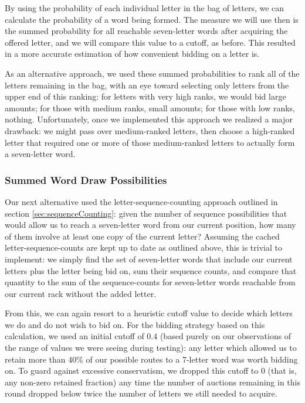 \documentclass[11pt]{article}
\begin{document}
By using the probability of each individual letter in the bag of letters, we can calculate the probability of a word being formed. 
The measure we will use then is the summed probability for all reachable seven-letter words after acquiring the offered letter, and we will compare this value to a cutoff, as before. This resulted in a more accurate estimation of how convenient bidding on a letter is.

As an alternative approach, we used these summed probabilities to rank all of the letters remaining in the bag, with an eye toward selecting only letters from the upper end of this ranking: for letters with very high ranks, we would bid large amounts; for those with medium ranks, small amounts; for those with low ranks, nothing.  Unfortunately, once we implemented this approach we realized a major drawback: we might pass over medium-ranked letters, then choose a high-ranked letter that required one or more of those medium-ranked letters to actually form a seven-letter word.

\subsubsection{Summed Word Draw Possibilities}

Our next alternative used the letter-sequence-counting approach outlined in section \ref{sec:sequenceCounting}: given the number of sequence possibilities that would allow us to reach a seven-letter word from our current position, how many of them involve at least one copy of the current letter?  Assuming the cached letter-sequence-counts are kept up to date as outlined above, this is trivial to implement: we simply find the set of seven-letter words that include our current letters plus the letter being bid on, sum their sequence counts, and compare that quantity to the sum of the sequence-counts for seven-letter words reachable from our current rack without the added letter.

From this, we can again resort to a heuristic cutoff value to decide which letters we do and do not wish to bid on.  For the bidding strategy based on this calculation, we used an initial cutoff of $0.4$ (based purely on our observations of the range of values we were seeing during testing): any letter which allowed us to retain more than 40\% of our possible routes to a 7-letter word was worth bidding on.  To guard against excessive conservatism, we  dropped this cutoff to  $0$ (that is, any non-zero retained fraction) any time the number of auctions remaining in this round dropped below twice the number of letters we still needed to acquire.
\end{document}
